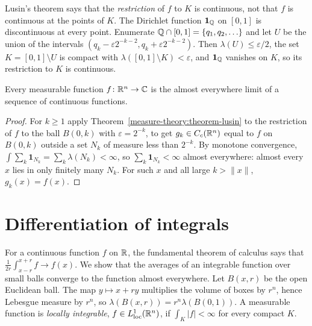\begin{example}\label{measure-theory:example-lusin-dirichlet}
Lusin's theorem says that the \emph{restriction} of $f$ to $K$ is continuous, not that $f$ is continuous at the points of $K$. The Dirichlet function
$\mathbf{1}_{\mathbb{Q}}$ on $[0, 1]$ is discontinuous at every point. Enumerate $\mathbb{Q} \cap [0, 1] = \{q_1, q_2, \ldots\}$ and let $U$ be the union of the intervals
$(q_k - \varepsilon2^{-k-2}, q_k + \varepsilon2^{-k-2})$. Then $\lambda(U) \leq \varepsilon/2$, the set $K = [0, 1] \setminus U$ is compact with
$\lambda([0, 1] \setminus K) < \varepsilon$, and $\mathbf{1}_{\mathbb{Q}}$ vanishes on $K$, so its restriction to $K$ is continuous.
\end{example}

\begin{corollary}\label{measure-theory:corollary-lusin-limit}
Every measurable function $f \colon \mathbb{R}^n \to \mathbb{C}$ is the almost everywhere limit of a sequence of continuous functions.
\end{corollary}

\begin{proof}
For $k \geq 1$ apply Theorem~\ref{measure-theory:theorem-lusin} to the restriction of $f$ to the ball $B(0, k)$ with $\varepsilon = 2^{-k}$, to get
$g_k \in C_c(\mathbb{R}^n)$ equal to $f$ on $B(0, k)$ outside a set $N_k$ of measure less than $2^{-k}$. By monotone convergence,
$\int\sum_k\mathbf{1}_{N_k} = \sum_k\lambda(N_k) < \infty$, so $\sum_k\mathbf{1}_{N_k} < \infty$ almost everywhere: almost every $x$ lies in only finitely many $N_k$.
For such $x$ and all large $k > \|x\|$, $g_k(x) = f(x)$.
\end{proof}

\section{Differentiation of integrals}\label{measure-theory:section-differentiation}

For a continuous function $f$ on $\mathbb{R}$, the fundamental theorem of calculus says that $\frac{1}{2r}\int_{x-r}^{x+r}f \to f(x)$. We show that the averages of
an integrable function over small balls converge to the function almost everywhere. Let $B(x, r)$ be the open Euclidean ball. The map $y \mapsto x + ry$ multiplies
the volume of boxes by $r^n$, hence Lebesgue measure by $r^n$, so $\lambda(B(x, r)) = r^n\lambda(B(0, 1))$. A measurable function is \emph{locally integrable},
$f \in L^1_{\mathrm{loc}}(\mathbb{R}^n)$, if $\int_K|f| < \infty$ for every compact $K$.

